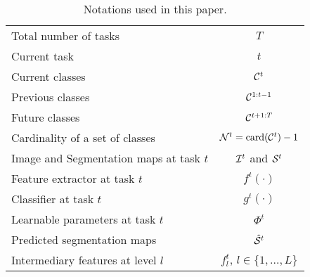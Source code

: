 \begin{table}[t]
    \centering
    \caption{Notations used in this paper.}
    \vspace*{-0.3cm}
    \label{tab:notation}
    \begin{tabular}{@{}l|c@{}}
        \toprule
        Total number of tasks                   & $T$                                      \\
        Current task                            & $t$                                      \\
        Current classes                         & $\mathcal{C}^t$                                 \\
        Previous classes                        & $\mathcal{C}^{1:t-1}$                           \\
        Future classes                          & $\mathcal{C}^{t+1:T}$                           \\
        Cardinality of a set of classes         & $\mathcal{N}^t=\operatorname{card}(\mathcal{C}^{t})-1$ \\
        Image and Segmentation maps at task $t$ & $\mathcal{I}^t$ and $\mathcal{S}^t$                    \\
        Feature extractor at task $t$           & $f^t(\cdot)$                             \\
        Classifier at task $t$                  & $g^t(\cdot)$                             \\
        Learnable parameters at task $t$        & $\Phi^t$                                 \\
        Predicted segmentation maps             & $\hat{\mathcal{S}}^t$                           \\
        Intermediary features at level $l$      & $f^t_l,\,l \in \{1, \dots, L\}$          \\
        \bottomrule
    \end{tabular}
\end{table}
